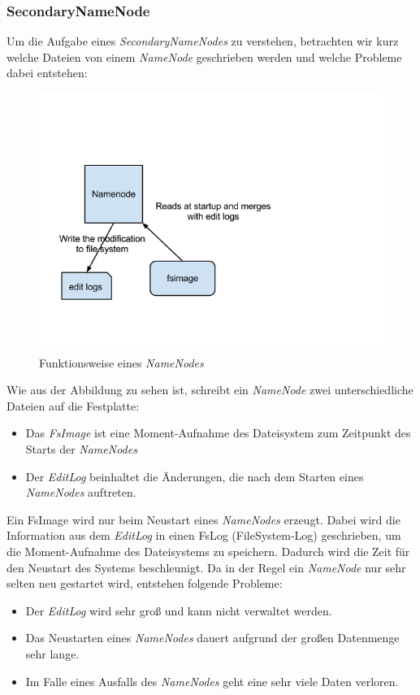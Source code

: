 \subsubsection{SecondaryNameNode}
Um die Aufgabe eines \textit{SecondaryNameNodes} zu verstehen, betrachten wir kurz welche Dateien von einem \textit{NameNode} geschrieben werden und welche Probleme dabei entstehen:
\begin{figure}[H]
	\centering
	\includegraphics[width=1.0\textwidth]{images/06namenode.png}
	\caption{Funktionsweise eines \textit{NameNodes}}
	\label{img:grafik-nameNode}
\end{figure}

Wie aus der Abbildung zu sehen ist, schreibt ein \textit{NameNode} zwei unterschiedliche Dateien auf die Festplatte: \\
\begin{itemize}
\item Das \textit{FsImage} ist eine Moment-Aufnahme des Dateisystem zum Zeitpunkt des Starts der \textit{NameNodes}
\item Der \textit{EditLog} beinhaltet die Änderungen, die nach dem Starten eines \textit{NameNodes} auftreten.
\end{itemize}
Ein FsImage wird nur beim Neustart eines \textit{NameNodes} erzeugt. Dabei wird die Information aus dem \textit{EditLog} in einen FsLog (FileSystem-Log) geschrieben, um die Moment-Aufnahme des Dateisystems zu speichern. Dadurch wird die Zeit für den Neustart des Systems beschleunigt.
Da in der Regel ein \textit{NameNode} nur sehr selten neu gestartet wird, entstehen folgende Probleme:
\begin{itemize}
\item Der \textit{EditLog} wird sehr groß und kann nicht verwaltet werden.
\item Das Neustarten eines \textit{NameNodes} dauert aufgrund der großen Datenmenge sehr lange.
\item Im Falle eines Ausfalls des \textit{NameNodes} geht eine sehr viele Daten verloren.
\end{itemize}

